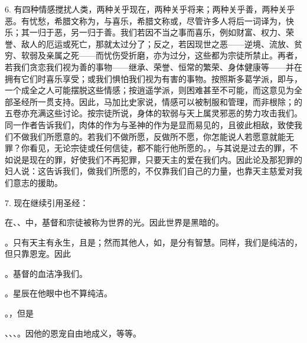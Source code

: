 6. 有四种情感搅扰人类，两种关乎现在，两种关乎将来；两种关乎善，两种关乎恶。有忧愁，希腊文称为，与喜乐，希腊文称或，尽管许多人将后一词译为，快乐；其一归于恶，另一归于善。我们若因不当之事而喜乐，例如财富、权力、荣誉、敌人的厄运或死亡，那就太过分了；反之，若因现世之恶——逆境、流放、贫穷、软弱及亲属之死——而忧伤受折磨，亦为过分，这些都为宗徒所禁止。再者，若我们贪恋我们视为善的事物——继承、荣誉、恒常的繁荣、身体健康等——并在拥有它们时喜乐享受；或我们惧怕我们视为有害的事物。按照斯多葛学派，即与，一个成全之人可能摆脱这些情感；按逍遥学派，则困难甚至不可能，而这意见为全部圣经所一贯支持。因此，马加比史家说，情感可以被制服和管理，而非根除；的五卷亦充满这些讨论。按宗徒所说，身体的软弱与天上属灵邪恶的势力攻击我们。同一作者告诉我们，肉体的作为与圣神的作为是显而易见的，且彼此相敌，致使我们不做我们所愿意的。若我们不做所愿，反做所不愿，你怎能说人若愿意就能无罪？你看见，无论宗徒或任何信徒，都不能行他所愿的。，与其说是过去的罪，不如说是现在的罪，好使我们不再犯罪，只要天主的爱在我们内。因此论及那犯罪的妇人说：这告诉我们，做我们所愿的，不仅靠我们自己的力量，也靠天主慈爱对我们意志的援助。\par

7. 现在继续引用圣经：\par

在、、中，基督和宗徒被称为世界的光。因此世界是黑暗的。\par

。只有天主有永生，且是；然而其他人，如，是分有智慧。同样，我们是纯洁的，但只靠恩宠。因此\par

。基督的血洁净我们。\par

。星辰在他眼中也不算纯洁。\par

。，但是\par

、、、。因他的恩宠自由地成义，等等。\par

